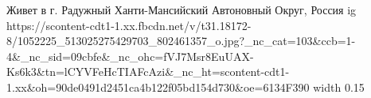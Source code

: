  
 
 
 
 

\par
Живет в г. Радужный
Ханти-Мансийский Автоновный Округ, Россия
\ifcmt
  ig https://scontent-cdt1-1.xx.fbcdn.net/v/t31.18172-8/1052225_513025275429703_802461357_o.jpg?_nc_cat=103&ccb=1-4&_nc_sid=09cbfe&_nc_ohc=fVJ7Msr8EuUAX-Ks6k3&tn=lCYVFeHcTIAFcAzi&_nc_ht=scontent-cdt1-1.xx&oh=90de0491d2451ca4b122f05bd154d730&oe=6134F390
  width 0.15
\fi
